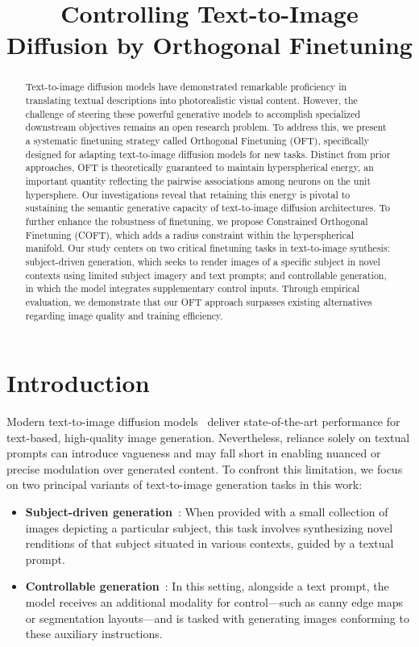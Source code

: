 \title{Controlling Text-to-Image Diffusion by Orthogonal Finetuning}

\begin{abstract}
Text-to-image diffusion models have demonstrated remarkable proficiency in translating textual descriptions into photorealistic visual content. However, the challenge of steering these powerful generative models to accomplish specialized downstream objectives remains an open research problem. To address this, we present a systematic finetuning strategy called Orthogonal Finetuning (OFT), specifically designed for adapting text-to-image diffusion models for new tasks. Distinct from prior approaches, OFT is theoretically guaranteed to maintain hyperspherical energy, an important quantity reflecting the pairwise associations among neurons on the unit hypersphere. Our investigations reveal that retaining this energy is pivotal to sustaining the semantic generative capacity of text-to-image diffusion architectures. To further enhance the robustness of finetuning, we propose Constrained Orthogonal Finetuning (COFT), which adds a radius constraint within the hyperspherical manifold. Our study centers on two critical finetuning tasks in text-to-image synthesis: subject-driven generation, which seeks to render images of a specific subject in novel contexts using limited subject imagery and text prompts; and controllable generation, in which the model integrates supplementary control inputs. Through empirical evaluation, we demonstrate that our OFT approach surpasses existing alternatives regarding image quality and training efficiency.
\end{abstract}

\section{Introduction}

Modern text-to-image diffusion models~\cite{saharia2022photorealistic,ramesh2022hierarchical,rombach2022high} deliver state-of-the-art performance for text-based, high-quality image generation. Nevertheless, reliance solely on textual prompts can introduce vagueness and may fall short in enabling nuanced or precise modulation over generated content. To confront this limitation, we focus on two principal variants of text-to-image generation tasks in this work:

\begin{itemize}[leftmargin=*,nosep]

    \item \textbf{Subject-driven generation}~\cite{ruiz2023dreambooth}: When provided with a small collection of images depicting a particular subject, this task involves synthesizing novel renditions of that subject situated in various contexts, guided by a textual prompt.
    \item \textbf{Controllable generation}~\cite{zhang2023adding,mou2023t2i}: In this setting, alongside a text prompt, the model receives an additional modality for control—such as canny edge maps or segmentation layouts—and is tasked with generating images conforming to these auxiliary instructions.
\end{itemize}

